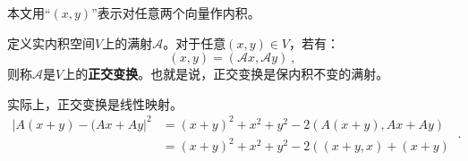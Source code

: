 
本文用“$(x,y)$”表示对任意两个向量作内积。
\begin{definition}{}
定义实内积空间$V$上的满射$\mathcal A$。对于任意$(x,y)\in V$，若有：
\begin{equation}
(x,y)=(\mathcal A x,\mathcal A y)~,
\end{equation}
则称$\mathcal A$是$V$上的\textbf{正交变换}。也就是说，正交变换是保内积不变的满射。
\end{definition}
实际上，正交变换是线性映射。
\begin{equation}
\begin{aligned}
|A(x+y)-(Ax+Ay|^2&=(x+y)^2+x^2+y^2-2\left(A(x+y),Ax+Ay\right)\\
&=(x+y)^2+x^2+y^2-2\left((x+y,x)+(x+y)
\end{aligned}~.
\end{equation}

